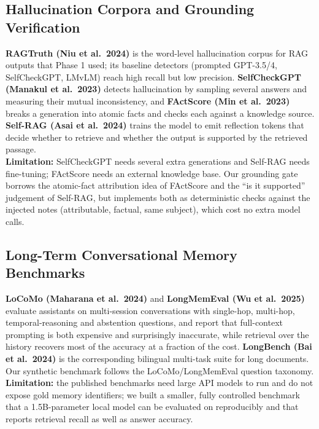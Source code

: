 \subsection{Hallucination Corpora and Grounding Verification}
\textbf{RAGTruth (Niu et al.\ 2024)} \cite{ragtruth} is the word-level hallucination corpus for RAG outputs
that Phase 1 used; its baseline detectors (prompted GPT-3.5/4, SelfCheckGPT, LMvLM) reach high recall but
low precision. \textbf{SelfCheckGPT (Manakul et al.\ 2023)} \cite{selfcheck} detects hallucination by
sampling several answers and measuring their mutual inconsistency, and \textbf{FActScore (Min et al.\ 2023)}
\cite{factscore} breaks a generation into atomic facts and checks each against a knowledge source.
\textbf{Self-RAG (Asai et al.\ 2024)} \cite{selfrag} trains the model to emit reflection tokens that decide
whether to retrieve and whether the output is supported by the retrieved passage. \\
\textbf{Limitation:} SelfCheckGPT needs several extra generations and Self-RAG needs fine-tuning;
FActScore needs an external knowledge base. Our grounding gate borrows the atomic-fact attribution idea of
FActScore and the ``is it supported'' judgement of Self-RAG, but implements both as deterministic checks
against the injected notes (attributable, factual, same subject), which cost no extra model calls.

\subsection{Long-Term Conversational Memory Benchmarks}
\textbf{LoCoMo (Maharana et al.\ 2024)} \cite{locomo} and \textbf{LongMemEval (Wu et al.\ 2025)}
\cite{longmemeval} evaluate assistants on multi-session conversations with single-hop, multi-hop,
temporal-reasoning and abstention questions, and report that full-context prompting is both expensive and
surprisingly inaccurate, while retrieval over the history recovers most of the accuracy at a fraction of
the cost. \textbf{LongBench (Bai et al.\ 2024)} \cite{longbench} is the corresponding bilingual
multi-task suite for long documents. Our synthetic benchmark follows the LoCoMo/LongMemEval question
taxonomy. \\
\textbf{Limitation:} the published benchmarks need large API models to run and do not expose gold memory
identifiers; we built a smaller, fully controlled benchmark that a 1.5B-parameter local model can be
evaluated on reproducibly and that reports retrieval recall as well as answer accuracy.

